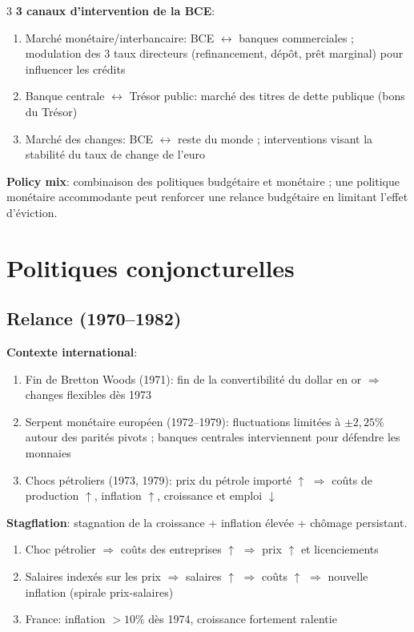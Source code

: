 \documentclass[12pt, a4paper]{article}
\begin{document}
\begin{multicols*}{3}
\textbf{3 canaux d'intervention de la BCE}:
\begin{enumerate}[\roman*.]
  \item Marché monétaire/interbancaire: BCE $\leftrightarrow$ banques commerciales ; modulation des 3 taux directeurs (refinancement, dépôt, prêt marginal) pour influencer les crédits
  \item Banque centrale $\leftrightarrow$ Trésor public: marché des titres de dette publique (bons du Trésor)
  \item Marché des changes: BCE $\leftrightarrow$ reste du monde ; interventions visant la stabilité du taux de change de l'euro
\end{enumerate}

\textbf{Policy mix}: combinaison des politiques budgétaire et monétaire ; une politique monétaire accommodante peut renforcer une relance budgétaire en limitant l'effet d'éviction.



\colbreak
\section{Politiques conjoncturelles}

\subsection{Relance (1970--1982)}

\textbf{Contexte international}:
\begin{enumerate}[\roman*.]
  \item Fin de Bretton Woods (1971): fin de la convertibilité du dollar en or $\Rightarrow$ changes flexibles dès 1973
  \item Serpent monétaire européen (1972--1979): fluctuations limitées à $\pm2,25\%$ autour des parités pivots ; banques centrales interviennent pour défendre les monnaies
  \item Chocs pétroliers (1973, 1979): prix du pétrole importé $\uparrow$ $\Rightarrow$ coûts de production $\uparrow$, inflation $\uparrow$, croissance et emploi $\downarrow$
\end{enumerate}

\textbf{Stagflation}: stagnation de la croissance + inflation élevée + chômage persistant.
\begin{enumerate}[\roman*.]
  \item Choc pétrolier $\Rightarrow$ coûts des entreprises $\uparrow$ $\Rightarrow$ prix $\uparrow$ et licenciements
  \item Salaires indexés sur les prix $\Rightarrow$ salaires $\uparrow$ $\Rightarrow$ coûts $\uparrow$ $\Rightarrow$ nouvelle inflation (spirale prix-salaires)
  \item France: inflation $>10\%$ dès 1974, croissance fortement ralentie
\end{enumerate}


\end{multicols*}
\end{document}
